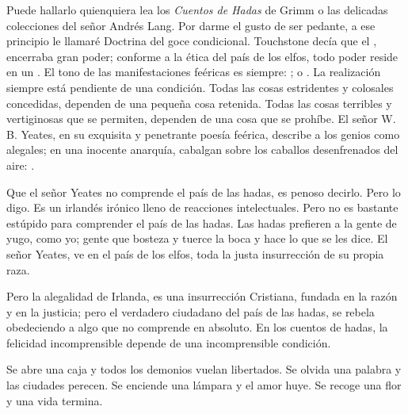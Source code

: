 Puede hallarlo quienquiera lea los \emph{Cuentos de Hadas} de Grimm o las delicadas
colecciones del señor Andrés Lang. Por darme el gusto de ser pedante, a ese principio le llamaré Doctrina
del goce condicional. Touchstone decía que el , encerraba gran poder; conforme a la ética del país de
los elfos, todo poder reside en un . El tono de las manifestaciones feéricas es siempre: ; o . La realización siempre está pendiente de una condición. Todas las cosas
estridentes y colosales concedidas, dependen de una pequeña cosa retenida. Todas las cosas terribles y
vertiginosas que se permiten, dependen de una cosa que se prohíbe. El señor W.\,B. Yeates, en su
exquisita y penetrante poesía feérica, describe a los genios como alegales; en una inocente anarquía,
cabalgan sobre los caballos desenfrenados del aire: .

Que el señor Yeates no comprende el país de las hadas, es penoso decirlo. Pero lo digo. Es un
irlandés irónico lleno de reacciones intelectuales. Pero no es bastante estúpido para comprender el país de
las hadas. Las hadas prefieren a la gente de yugo, como yo; gente que bosteza y tuerce la boca y hace lo
que se les dice. El señor Yeates, ve en el país de los elfos, toda la justa insurrección de su propia raza.

Pero la alegalidad de Irlanda, es una insurrección Cristiana, fundada en la razón y en la justicia;
pero el verdadero ciudadano del país de las hadas, se rebela obedeciendo a algo que no comprende en
absoluto. En los cuentos de hadas, la felicidad incomprensible depende de una incomprensible condición.

Se abre una caja y todos los demonios vuelan libertados. Se olvida una palabra y las ciudades perecen. Se
enciende una lámpara y el amor huye. Se recoge una flor y una vida termina.

